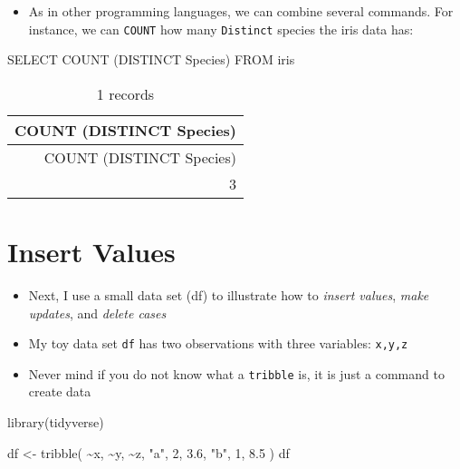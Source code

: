 \documentclass[
  letterpaper,
  DIV=11,
  numbers=noendperiod]{scrreprt}
\newenvironment{Shaded}{\begin{snugshade}}{\end{snugshade}}
\newcommand{\DecValTok}[1]{\textcolor[rgb]{0.68,0.00,0.00}{#1}}
\newcommand{\FloatTok}[1]{\textcolor[rgb]{0.68,0.00,0.00}{#1}}
\newcommand{\FunctionTok}[1]{\textcolor[rgb]{0.28,0.35,0.67}{#1}}
\newcommand{\KeywordTok}[1]{\textcolor[rgb]{0.00,0.23,0.31}{#1}}
\newcommand{\NormalTok}[1]{\textcolor[rgb]{0.00,0.23,0.31}{#1}}
\newcommand{\OtherTok}[1]{\textcolor[rgb]{0.00,0.23,0.31}{#1}}
\newcommand{\SpecialCharTok}[1]{\textcolor[rgb]{0.37,0.37,0.37}{#1}}
\newcommand{\StringTok}[1]{\textcolor[rgb]{0.13,0.47,0.30}{#1}}
\providecommand{\tightlist}{%
  \setlength{\itemsep}{0pt}\setlength{\parskip}{0pt}}\usepackage{longtable,booktabs,array}
\begin{document}
\begin{itemize}
\tightlist
\item
  As in other programming languages, we can combine several commands.
  For instance, we can \texttt{COUNT} how many \texttt{Distinct} species
  the iris data has:
\end{itemize}

\begin{Shaded}
\begin{Highlighting}[]
\KeywordTok{SELECT} \FunctionTok{COUNT}\NormalTok{ (}\KeywordTok{DISTINCT}\NormalTok{ Species) }\KeywordTok{FROM}\NormalTok{ iris}
\end{Highlighting}
\end{Shaded}

\begin{longtable}[]{@{}r@{}}
\caption{1 records}\tabularnewline
\toprule()
COUNT (DISTINCT Species) \\
\midrule()
\endfirsthead
\toprule()
COUNT (DISTINCT Species) \\
\midrule()
\endhead
3 \\
\bottomrule()
\end{longtable}

\hypertarget{insert-values}{%
\section{Insert Values}\label{insert-values}}

\begin{itemize}
\item
  Next, I use a small data set (df) to illustrate how to \emph{insert
  values}, \emph{make updates}, and \emph{delete cases}
\item
  My toy data set \texttt{df} has two observations with three variables:
  \texttt{x,y,z}
\item
  Never mind if you do not know what a \texttt{tribble} is, it is just a
  command to create data
\end{itemize}

\begin{Shaded}
\begin{Highlighting}[]
\FunctionTok{library}\NormalTok{(tidyverse)}

\NormalTok{df }\OtherTok{\textless{}{-}} \FunctionTok{tribble}\NormalTok{(}
  \SpecialCharTok{\textasciitilde{}}\NormalTok{x, }\SpecialCharTok{\textasciitilde{}}\NormalTok{y,  }\SpecialCharTok{\textasciitilde{}}\NormalTok{z,}
  \StringTok{"a"}\NormalTok{, }\DecValTok{2}\NormalTok{,  }\FloatTok{3.6}\NormalTok{,}
  \StringTok{"b"}\NormalTok{, }\DecValTok{1}\NormalTok{,  }\FloatTok{8.5}
\NormalTok{)}
\NormalTok{df}
\end{Highlighting}
\end{Shaded}
\end{document}
